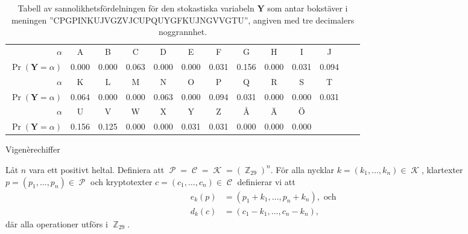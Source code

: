 \documentclass{beamer}
\theoremstyle{definition}
\DeclareMathOperator{\p}{\mathcal{P}}
\let\P\p
\DeclareMathOperator{\C}{\mathcal{C}}
\DeclareMathOperator{\K}{\mathcal{K}}
\DeclareMathOperator{\Z}{\mathbb{Z}}
\let\stoch\mathbf
\renewcommand{\p}{\stoch P}
\newcommand{\y}{\stoch Y}
\begin{document}
\begin{frame}{\insertsubsectionhead}
  \begin{table}
    \centering\tiny
    \begin{tabular}{r|cccccccccccc}
      \toprule
      \(\alpha\) & A & B & C & D & E & F & G & H & I & J \\
      \(\Pr(\y = \alpha)\) & 0.000 & 0.000 & 0.063  & 0.000 & 0.000 & 0.031 
      & 0.156 & 0.000 & 0.031 & 0.094 \\
      \midrule
      \(\alpha\) & K & L & M & N & O & P & Q & R & S & T \\
      \(\Pr(\y = \alpha)\) & 0.064 & 0.000 & 0.000 & 0.063 & 0.000 & 0.094 
      & 0.031 & 0.000 & 0.000 & 0.031 \\
      \midrule
      \(\alpha\) & U & V & W & X & Y & Z & Å & Ä & Ö \\
      \(\Pr(\y = \alpha)\) & 0.156 & 0.125 & 0.000 & 0.000 &  0.031 & 0.031 
      & 0.000 & 0.000 & 0.000 \\
      \bottomrule
    \end{tabular}
    \caption{Tabell av sannolikhetsfördelningen för den stokastiska variabeln 
    \(\y\) som antar bokstäver i meningen ''CPGPINKUJVGZVJCUPQUYGFKUJNGVVGTU'', 
    angiven med tre decimalers noggrannhet.}
    \label{tbl:SannolikhetstabellKryptotext}
  \end{table}
\end{frame}

\begin{frame}{\insertsubsectionhead}{Vigenèrechiffer}
  \begin{definition}[Vigenèrechiffer]
    Låt \(n\) vara ett positivt heltal.
    Definiera att \(\P = \C = \K = (\Z_{29})^n\).
    För alla nycklar \(k = (k_1,\ldots,k_n)\in \K\), klartexter \(p = (p_1, 
    \ldots, p_n)\in \P\) och kryptotexter \(c = (c_1,\ldots,c_n)\in \C\) 
    definierar vi att
    \begin{align}
      \nonumber
      e_k(p) &= (p_1 + k_1, \ldots, p_n + k_n), \text{ och } \\
      \nonumber
      d_k(c) &= (c_1 - k_1, \ldots, c_n - k_n),
    \end{align}
    där alla operationer utförs i \(\Z_{29}\).
  \end{definition}
\end{frame}
\end{document}
